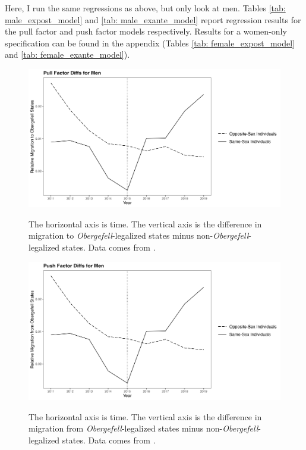 \documentclass[12pt,letterpaper]{article}
\begin{document}
Here, I run the same regressions as above, but only look at men. Tables \ref{tab: male_expost_model} and \ref{tab: male_exante_model} report regression results for the pull factor and push factor models respectively. Results for a women-only specification can be found in the appendix (Tables \ref{tab: female_expost_model} and \ref{tab: female_exante_model}).
\begin{figure}[htbp]
    \centering
    \caption{}
    \label{fig: men_post_diffs}
    \includegraphics[width=.75\linewidth]{outputs/summary_stats/men_post_diffs.png}

    \vspace{0.5em}
    \begin{minipage}{0.75\linewidth}
        \footnotesize The horizontal axis is time. The vertical axis is the difference in migration to \textit{Obergefell}-legalized states minus non-\textit{Obergefell}-legalized states. Data comes from \citet{28}.
    \end{minipage}
\end{figure}
\begin{figure}[htbp]
    \centering
    \caption{}
    \label{fig: men_ante_diffs}
    \includegraphics[width=.75\linewidth]{outputs/summary_stats/men_ante_diffs.png}

    \vspace{0.5em}
    \begin{minipage}{0.75\linewidth}
        \footnotesize The horizontal axis is time. The vertical axis is the difference in migration from \textit{Obergefell}-legalized states minus non-\textit{Obergefell}-legalized states. Data comes from \citet{28}.
    \end{minipage}
\end{figure}
\end{document}
